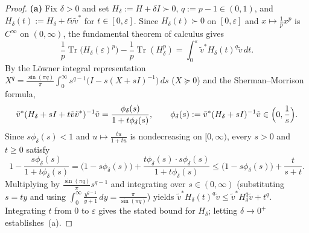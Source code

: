 \documentclass[10pt,letterpaper]{article}
\newcommand{\Tr}{\operatorname{Tr}}
\begin{document}
\begin{proof}
\textbf{(a)} Fix $\delta > 0$ and set $H_\delta := H + \delta I \succ 0$, $q := p - 1 \in (0,1)$, and $H_\delta(t) := H_\delta + t\tilde{v}\tilde{v}^*$ for $t \in [0,\varepsilon]$. Since $H_\delta(t) \succ 0$ on $[0,\varepsilon]$ and $x \mapsto \frac{1}{p}x^p$ is $C^\infty$ on $(0,\infty)$, the fundamental theorem of calculus gives
\[
  \frac{1}{p}\Tr\bigl(H_\delta(\varepsilon)^p\bigr) - \frac{1}{p}\Tr(H_\delta^p) = \int_0^\varepsilon \tilde{v}^* H_\delta(t)^q \tilde{v}\,dt.
\]
By the L\"owner integral representation $X^q = \frac{\sin(\pi q)}{\pi}\int_0^\infty s^{q-1}\bigl(I - s(X+sI)^{-1}\bigr)\,ds$ ($X \succeq 0$) and the Sherman--Morrison formula,
\[
  \tilde{v}^*(H_\delta + sI + t\tilde{v}\tilde{v}^*)^{-1}\tilde{v} = \frac{\phi_\delta(s)}{1 + t\phi_\delta(s)},
  \qquad \phi_\delta(s) := \tilde{v}^*(H_\delta + sI)^{-1}\tilde{v} \in \Bigl(0, \frac{1}{s}\Bigr).
\]
Since $s\phi_\delta(s) < 1$ and $u \mapsto \frac{tu}{1+tu}$ is nondecreasing on $[0,\infty)$, every $s > 0$ and $t \ge 0$ satisfy
\[
  1 - \frac{s\phi_\delta(s)}{1 + t\phi_\delta(s)}
  = \bigl(1 - s\phi_\delta(s)\bigr) + \frac{t\phi_\delta(s)\cdot s\phi_\delta(s)}{1 + t\phi_\delta(s)}
  \le \bigl(1 - s\phi_\delta(s)\bigr) + \frac{t}{s + t}.
\]
Multiplying by $\frac{\sin(\pi q)}{\pi} s^{q-1}$ and integrating over $s \in (0,\infty)$ (substituting $s = ty$ and using $\int_0^\infty \frac{y^{q-1}}{y+1}\,dy = \frac{\pi}{\sin(\pi q)}$) yields $\tilde{v}^* H_\delta(t)^q \tilde{v} \le \tilde{v}^* H_\delta^q \tilde{v} + t^q$. Integrating $t$ from $0$ to $\varepsilon$ gives the stated bound for $H_\delta$; letting $\delta \to 0^+$ establishes~(a).


\end{proof}
\end{document}

